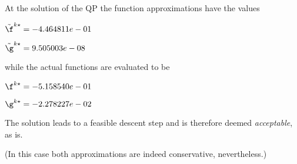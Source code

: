 At the solution of the QP the function approximations have the values

$\tilde \f^{k\star} = -4.464811e-01$

$\tilde \g^{k\star} =  9.505003e-08$

\bigskip
while the actual functions are evaluated to be

$\f^{k\star} = -5.158540e-01$

$\g^{k\star} = -2.278227e-02$

\bigskip
 The solution leads to a feasible descent step and                     is therefore deemed \emph{acceptable}, as is. 
 
(In this case both approximations are indeed conservative,                         nevertheless.)